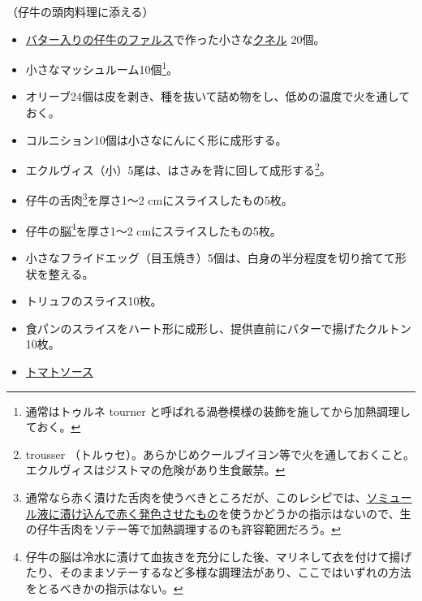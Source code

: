 \begin{recette}


（仔牛の頭肉料理に添える）

\begin{itemize}
\item
  \protect\hyperlink{farce-b}{バター入りの仔牛のファルス}で作った小さな\protect\hyperlink{quenelles-diverses}{クネル}
  20個。
\item
  小さなマッシュルーム10個\footnote{通常はトゥルネ tourner
    と呼ばれる渦巻模様の装飾を施してから加熱調理しておく。}。
\item
  オリーブ24個は皮を剥き、種を抜いて詰め物をし、低めの温度で火を通しておく。
\item
  コルニション10個は小さなにんにく形に成形する。
\item
  エクルヴィス（小）5尾は、はさみを背に回して成形する\footnote{trousser
    （トルゥセ）。あらかじめクールブイヨン等で火を通しておくこと。エクルヴィスはジストマの危険があり生食厳禁。}。
\item
  仔牛の舌肉\footnote{通常なら赤く漬けた舌肉を使うべきところだが、このレシピでは、\protect\hyperlink{saumure-liquide-pour-langues}{ソミュール液に漬け込んで赤く発色させたもの}を使うかどうかの指示はないので、生の仔牛舌肉をソテー等で加熱調理するのも許容範囲だろう。}を厚さ1〜2
  cmにスライスしたもの5枚。
\item
  仔牛の脳\footnote{仔牛の脳は冷水に漬けて血抜きを充分にした後、マリネして衣を付けて揚げたり、そのままソテーするなど多様な調理法があり、ここではいずれの方法をとるべきかの指示はない。}を厚さ1〜2
  cmにスライスしたもの5枚。
\item
  小さなフライドエッグ（目玉焼き）5個は、白身の半分程度を切り捨てて形状を整える。
\item
  トリュフのスライス10枚。
\item
  食パンのスライスをハート形に成形し、提供直前にバターで揚げたクルトン10枚。
\item
  \protect\hyperlink{sauce-tomate}{トマトソース}
\end{itemize}

\atoaki{}

\hypertarget{garniture-toulousaine}{%
}
\end{recette}

